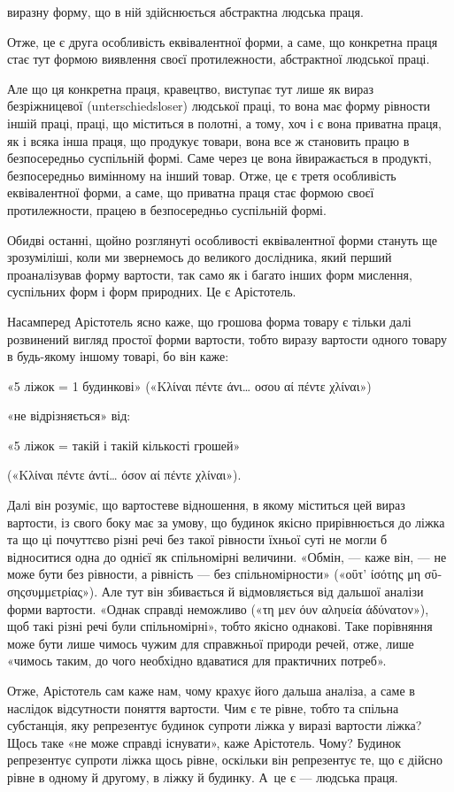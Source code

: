\parcont{}  %
виразну форму, що в ній здійснюється абстрактна людська праця.

Отже, це є друга особливість еквівалентної форми, а саме, що конкретна праця стає тут формою
виявлення своєї протилежности,
абстрактної людської праці.

Але що ця конкретна праця, кравецтво, виступає тут лише як вираз безріжницевої (unterschiedsloser)
людської праці, то вона має форму рівности іншій праці, праці, що міститься в полотні, а тому, хоч і
є вона приватна праця, як і всяка інша праця, що продукує товари, вона все ж становить працю в
безпосередньо суспільній формі. Саме через це вона йвиражається в продукті, безпосередньо вимінному
на інший товар. Отже, це є третя особливість еквівалентної форми, а саме, що приватна праця стає
формою своєї протилежности, працею в безпосередньо суспільній формі.

Обидві останні, щойно розглянуті особливості еквівалентної форми стануть ще зрозуміліші, коли ми
звернемось до великого дослідника, який перший проаналізував форму вартости, так само як і багато
інших форм мислення, суспільних форм і форм природних. Це є Арістотель.

Насамперед Арістотель ясно каже, що грошова форма товару є тільки далі розвинений вигляд простої
форми вартости, тобто виразу вартости одного товару в будь-якому іншому товарі, бо він каже:

\begin{center}
«5 ліжок = 1 будинкові»
(«\textgreek{Κλίναι πέντε άνι\dots{} οσου αί πέντε χλίναι}»)

«не відрізняється» від:

«5 ліжок = такій і такій кількості грошей»

(«\textgreek{Κλίναι πέντε άντί\dots{} όσον αί πέντε χλίναι}»).
\end{center}

Далі він розуміє, що вартостеве відношення, в якому міститься цей вираз вартости, із свого боку має
за умову, що будинок якісно прирівнюється до ліжка та що ці почуттєво різні речі без такої рівности
їхньої суті не могли б відноситися одна до однієї як спільномірні величини. «Обмін, — каже він, — не
може бути без рівности, а рівність — без спільномірности» («\textgreek{οΰτ’ ίσότης μη σΰσηςσυμμετρίας}»). Але
тут він збивається й відмовляється від дальшої аналізи форми вартости. «Однак справді неможливо
(«\textgreek{τη μεν όυν αληυεία άδύνατον}»), щоб такі різні речі були спільномірні», тобто якісно однакові. Таке
порівняння може бути лише чимось чужим для справжньої природи речей, отже, лише «чимось таким, до
чого необхідно вдаватися для практичних потреб».

Отже, Арістотель сам каже нам, чому крахує його дальша аналіза, а саме в наслідок відсутности
поняття вартости. Чим є те рівне, тобто та спільна субстанція, яку репрезентує будинок супроти ліжка
у виразі вартости ліжка? Щось таке «не може справді існувати», каже Арістотель. Чому? Будинок
репрезентує супроти ліжка щось рівне, оскільки він репрезентує те, що є дійсно рівне в одному й
другому, в ліжку й будинку. А~це є — людська праця.

